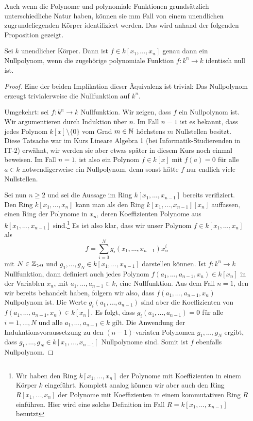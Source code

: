 \documentclass[11pt]{article}
\numberwithin{equation}{section}
\begin{document}
Auch wenn die Polynome und polynomiale Funktionen grundsätzlich unterschiedliche Natur haben, können sie mm Fall von einem unendlichen zugrundeliegenden Körper  identifiziert werden. Das wird anhand der folgenden Proposition gezeigt. 

\begin{proposition} \label{prop:nullpolynom}
	Sei $k$ unendlicher Körper. Dann ist $f \in k[x_1,\ldots,x_n]$ genau dann ein Nullpolynom, wenn die zugehörige polynomiale Funktion $f : k^n \to k$ identisch null ist. 
\end{proposition} 
\begin{proof}
	Eine der beiden Implikation dieser Äquivalenz ist trivial: Das Nullpolynom erzeugt trivialerweise die Nullfunktion auf $k^n$. 
	
	Umgekehrt: sei $f : k^n \to k$ Nullfunktion. Wir zeigen, dass $f$ ein Nullpolynom ist. 	Wir argumentieren durch Induktion über $n$.  Im Fall $n=1$ ist es bekannt, dass jedes Polynom  $k[x] \setminus \{0\}$ vom Grad $m \in \mathbb{N}$ höchstens $m$ Nullstellen besitzt. Diese Tatsache war im Kurs Lineare Algebra 1 (bei Informatik-Studierenden in IT-2) erwähnt, wir werden sie aber etwas später in diesem Kurs noch einmal beweisen. Im Fall $n=1$, ist also ein Polynom $f \in k[x]$ mit $f(a)=0$ für alle $a \in k$ notwendigerweise ein Nullpolynom, denn sonst hätte $f$ nur endlich viele Nullstellen. 
	
	Sei nun $n \ge 2$ und sei die Aussage im Ring $k[x_1,\ldots,x_{n-1}]$ bereits verifiziert. Den Ring $k[x_1,\ldots,x_n]$ kann man als den Ring $k[x_1,\ldots,x_{n-1}][x_n]$ auffassen, einen Ring der Polynome in $x_n$, deren Koeffizienten Polynome aus $k[x_1,\ldots,x_{n-1}]$ sind.\footnote{Wir haben den Ring $k[x_1,\ldots,x_n]$ der Polynome mit Koeffizienten in einem Körper $k$ eingeführt. Komplett analog können wir aber auch den Ring $R[x_1,\ldots,x_n]$ der Polynome mit Koeffizienten in einem kommutativen Ring $R$ einführen. Hier wird eine solche Definition im Fall $R=k[x_1,\ldots,x_{n-1}]$ benutzt} 
	Es ist also klar, dass wir unser Polynom $f \in k[x_1,\ldots,x_n]$ als 
	\[
		f = \sum_{i=0}^N g_i(x_1,\ldots,x_{n-1}) x_n^i
	\]
	mit $N \in \mathbb{Z}_{>0}$ und $g_1,\ldots,g_N \in k[x_1,\ldots,x_{n-1}]$ darstellen können. Ist $f : k^n \to k$ Nullfunktion, dann definiert auch jedes  Polynom $f(a_1,\ldots,a_{n-1},x_n) \in k[x_n]$ in der Variablen $x_n$, mit $a_1,\ldots,a_{n-1} \in k$, eine Nullfunktion. Aus dem Fall $n=1$, den wir bereits behandelt haben, folgern wir also, dass $f(a_1,\ldots,a_{n-1},x_n)$ Nullpolynom ist. Die Werte $g_i(a_1,\ldots,a_{n-1})$ sind aber die Koeffizienten von $f(a_1,\ldots,a_{n-1},x_n) \in k[x_n]$. Es folgt, dass $g_i(a_1,\ldots,a_{n-1}) = 0$ für alle $i=1,\ldots,N$ und alle $a_1,\ldots,a_{n-1} \in k$ gilt. Die Anwendung der Indukntionsvoraussetzung zu den $(n-1)$-variaten Polynomen $g_1,\ldots,g_N$ ergibt, dass $g_1,\ldots,g_N \in k[x_1,\ldots,x_{n-1}]$ Nullpolynome sind. Somit ist $f$ ebenfalls Nullpolynom. 
\end{proof} 
\end{document}

